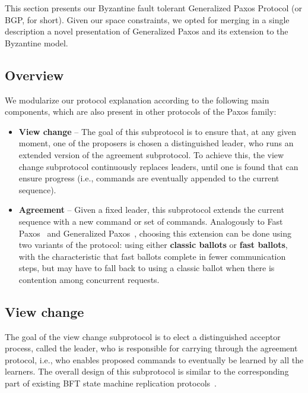 This section presents our Byzantine fault tolerant Generalized Paxos
Protocol (or BGP, for short). Given our space constraints, we opted
for merging in a single description a novel presentation of
Generalized Paxos and its extension to the Byzantine model.
\subsection{Overview}

We modularize our protocol explanation according to the following main components, which are also present in other protocols of the Paxos family:

\begin{itemize}

\item
  {\bf View change} -- The goal of this subprotocol is to ensure that, at any given moment, one of the proposers is chosen a distinguished leader, who runs an extended version of the agreement subprotocol. To achieve this, the view change subprotocol continuously replaces leaders, until one is found that can ensure progress (i.e., commands are eventually appended to the current sequence).

\item
{\bf Agreement} -- Given a fixed leader, this subprotocol extends the current sequence with a new command or set of commands. Analogously to Fast Paxos~\cite{L06} and Generalized Paxos~\cite{Lamport2005}, choosing this extension can be done using two variants of the protocol: using either {\bf classic ballots} or {\bf fast ballots}, with the characteristic that fast ballots complete in fewer communication steps, but may have to fall back to using a classic ballot when there is contention among concurrent requests.

\end{itemize}

\subsection{View change} 

The goal of the view change subprotocol is to elect a distinguished acceptor process, called the leader, who is responsible for carrying through the agreement protocol, i.e., who enables proposed commands to eventually be learned by all the learners. The overall design of this subprotocol is similar to the corresponding part of existing BFT state machine replication protocols~\cite{CL99}.

